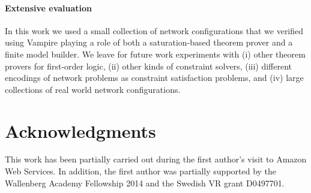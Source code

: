 \paragraph{Extensive evaluation} In this work we used a small collection of network configurations that we verified using Vampire playing a role of both a saturation-based theorem prover and a finite model builder. We leave for future work experiments with (i) other theorem provers for first-order logic, (ii) other kinds of constraint solvers, (iii) different encodings of network problems as constraint satisfaction problems, and (iv) large collections of real world network configurations.

\section*{Acknowledgments}
\label{sect:aws/acks}
This work has been partially carried out during the first author's visit to Amazon Web Services. In addition, the first author was partially supported by the Wallenberg Academy Fellowship 2014 and the Swedish VR grant D0497701.
